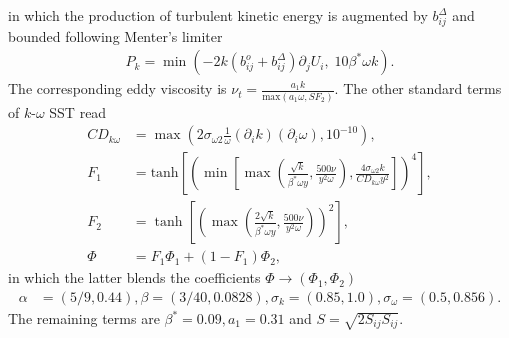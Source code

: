 \documentclass[10pt,a4paper,twoside]{article}
\newcommand{\bij}{b_{ij}}
\newcommand{\komegasst}{$k$-$\omega$ SST}
\newcommand{\bdelta}{b^\Delta_{ij}}
\begin{document}
\noindent in which the production of turbulent kinetic energy is augmented by $\bdelta$ and bounded following Menter's limiter\cite{Menter2003a}
\begin{align}
	P_k = \min \left(-2k(\bij^o + \bdelta) \partial_j U_i, \;10 \beta^* \omega k\right).
	\label{eq::productionlimiter}
\end{align}
The corresponding eddy viscosity is $\nu_t = \frac{a_1 k}{\text{max}(a_1 \omega, SF_2)}$. The other standard terms of \komegasst{} read
\begin{align}	
	 CD_{k\omega} &= \max \left( 2 \sigma_{\omega 2} \frac{1}{\omega}(\partial_i k)(\partial_i \omega), 10^{-10} \right), \nonumber\\
	 F_1 &= \text{tanh}\left[\left(\min \left[\max \left(\frac{\sqrt{k}}{\beta^* \omega y}, \frac{500\nu}{y^2\omega} \right), \frac{4\sigma_{\omega 2}k}{CD_{k\omega}y^2} \right] \right)^4\right],\nonumber\\
	 F_2 &= \tanh \left[ \left( \max \left( \frac{2\sqrt{k}}{\beta^* \omega y}, \frac{500\nu}{y^2 \omega} \right) \right)^2  \right], \nonumber\\
	 \Phi &= F_1\Phi_1 + (1-F_1)\Phi_2,
	 \end{align}
\noindent in which the latter blends the coefficients $\Phi \rightarrow (\Phi_1, \Phi_2)$
\begin{align}
	\alpha &= (5/9,0.44), \beta = (3/40,0.0828), \sigma_k = (0.85,1.0), \sigma_\omega = (0.5,0.856).
\end{align}
The remaining terms are $\beta^*=0.09, a_1 = 0.31$ and $S = \sqrt{2S_{ij}S_{ij}}$.
\end{document}
